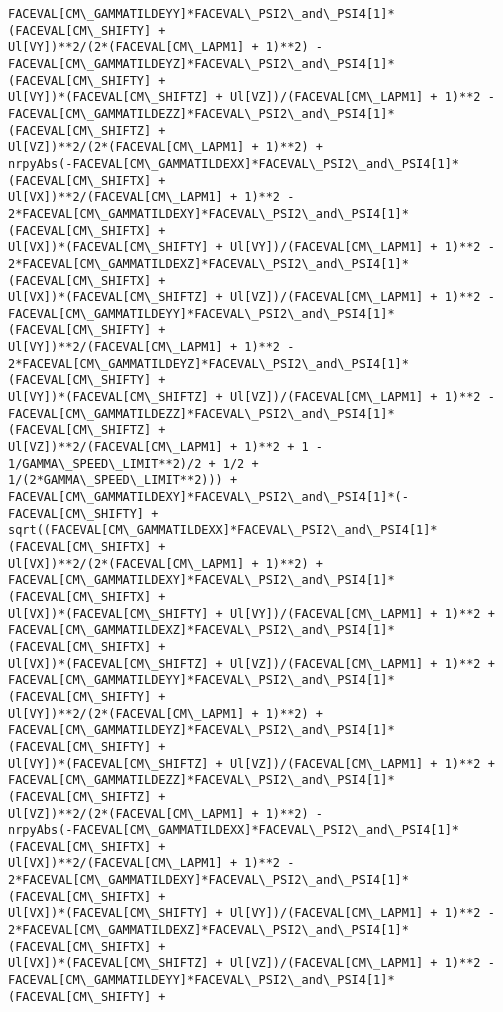 \documentclass[landscape,letterpaper,10pt,english]{article}
\begin{document}
\begin{Verbatim}[commandchars=\\\{\}]
FACEVAL[CM\_GAMMATILDEYY]*FACEVAL\_PSI2\_and\_PSI4[1]*(FACEVAL[CM\_SHIFTY] +
Ul[VY])**2/(2*(FACEVAL[CM\_LAPM1] + 1)**2) -
FACEVAL[CM\_GAMMATILDEYZ]*FACEVAL\_PSI2\_and\_PSI4[1]*(FACEVAL[CM\_SHIFTY] +
Ul[VY])*(FACEVAL[CM\_SHIFTZ] + Ul[VZ])/(FACEVAL[CM\_LAPM1] + 1)**2 -
FACEVAL[CM\_GAMMATILDEZZ]*FACEVAL\_PSI2\_and\_PSI4[1]*(FACEVAL[CM\_SHIFTZ] +
Ul[VZ])**2/(2*(FACEVAL[CM\_LAPM1] + 1)**2) +
nrpyAbs(-FACEVAL[CM\_GAMMATILDEXX]*FACEVAL\_PSI2\_and\_PSI4[1]*(FACEVAL[CM\_SHIFTX] +
Ul[VX])**2/(FACEVAL[CM\_LAPM1] + 1)**2 -
2*FACEVAL[CM\_GAMMATILDEXY]*FACEVAL\_PSI2\_and\_PSI4[1]*(FACEVAL[CM\_SHIFTX] +
Ul[VX])*(FACEVAL[CM\_SHIFTY] + Ul[VY])/(FACEVAL[CM\_LAPM1] + 1)**2 -
2*FACEVAL[CM\_GAMMATILDEXZ]*FACEVAL\_PSI2\_and\_PSI4[1]*(FACEVAL[CM\_SHIFTX] +
Ul[VX])*(FACEVAL[CM\_SHIFTZ] + Ul[VZ])/(FACEVAL[CM\_LAPM1] + 1)**2 -
FACEVAL[CM\_GAMMATILDEYY]*FACEVAL\_PSI2\_and\_PSI4[1]*(FACEVAL[CM\_SHIFTY] +
Ul[VY])**2/(FACEVAL[CM\_LAPM1] + 1)**2 -
2*FACEVAL[CM\_GAMMATILDEYZ]*FACEVAL\_PSI2\_and\_PSI4[1]*(FACEVAL[CM\_SHIFTY] +
Ul[VY])*(FACEVAL[CM\_SHIFTZ] + Ul[VZ])/(FACEVAL[CM\_LAPM1] + 1)**2 -
FACEVAL[CM\_GAMMATILDEZZ]*FACEVAL\_PSI2\_and\_PSI4[1]*(FACEVAL[CM\_SHIFTZ] +
Ul[VZ])**2/(FACEVAL[CM\_LAPM1] + 1)**2 + 1 - 1/GAMMA\_SPEED\_LIMIT**2)/2 + 1/2 +
1/(2*GAMMA\_SPEED\_LIMIT**2))) +
FACEVAL[CM\_GAMMATILDEXY]*FACEVAL\_PSI2\_and\_PSI4[1]*(-FACEVAL[CM\_SHIFTY] +
sqrt((FACEVAL[CM\_GAMMATILDEXX]*FACEVAL\_PSI2\_and\_PSI4[1]*(FACEVAL[CM\_SHIFTX] +
Ul[VX])**2/(2*(FACEVAL[CM\_LAPM1] + 1)**2) +
FACEVAL[CM\_GAMMATILDEXY]*FACEVAL\_PSI2\_and\_PSI4[1]*(FACEVAL[CM\_SHIFTX] +
Ul[VX])*(FACEVAL[CM\_SHIFTY] + Ul[VY])/(FACEVAL[CM\_LAPM1] + 1)**2 +
FACEVAL[CM\_GAMMATILDEXZ]*FACEVAL\_PSI2\_and\_PSI4[1]*(FACEVAL[CM\_SHIFTX] +
Ul[VX])*(FACEVAL[CM\_SHIFTZ] + Ul[VZ])/(FACEVAL[CM\_LAPM1] + 1)**2 +
FACEVAL[CM\_GAMMATILDEYY]*FACEVAL\_PSI2\_and\_PSI4[1]*(FACEVAL[CM\_SHIFTY] +
Ul[VY])**2/(2*(FACEVAL[CM\_LAPM1] + 1)**2) +
FACEVAL[CM\_GAMMATILDEYZ]*FACEVAL\_PSI2\_and\_PSI4[1]*(FACEVAL[CM\_SHIFTY] +
Ul[VY])*(FACEVAL[CM\_SHIFTZ] + Ul[VZ])/(FACEVAL[CM\_LAPM1] + 1)**2 +
FACEVAL[CM\_GAMMATILDEZZ]*FACEVAL\_PSI2\_and\_PSI4[1]*(FACEVAL[CM\_SHIFTZ] +
Ul[VZ])**2/(2*(FACEVAL[CM\_LAPM1] + 1)**2) -
nrpyAbs(-FACEVAL[CM\_GAMMATILDEXX]*FACEVAL\_PSI2\_and\_PSI4[1]*(FACEVAL[CM\_SHIFTX] +
Ul[VX])**2/(FACEVAL[CM\_LAPM1] + 1)**2 -
2*FACEVAL[CM\_GAMMATILDEXY]*FACEVAL\_PSI2\_and\_PSI4[1]*(FACEVAL[CM\_SHIFTX] +
Ul[VX])*(FACEVAL[CM\_SHIFTY] + Ul[VY])/(FACEVAL[CM\_LAPM1] + 1)**2 -
2*FACEVAL[CM\_GAMMATILDEXZ]*FACEVAL\_PSI2\_and\_PSI4[1]*(FACEVAL[CM\_SHIFTX] +
Ul[VX])*(FACEVAL[CM\_SHIFTZ] + Ul[VZ])/(FACEVAL[CM\_LAPM1] + 1)**2 -
FACEVAL[CM\_GAMMATILDEYY]*FACEVAL\_PSI2\_and\_PSI4[1]*(FACEVAL[CM\_SHIFTY] +

\end{Verbatim}
\end{document}
